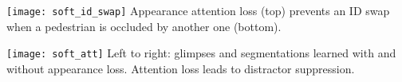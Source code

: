 
\vspace{.5\baselineskip}

\centering
\begin{minipage}[c]{.3\textwidth}
    \centering
    \texttt{[image: soft\_id\_swap]}
    \vspace{.5\baselineskip}
    Appearance attention loss (top) prevents an ID swap when a pedestrian is occluded by another one (bottom).
\end{minipage}
\begin{minipage}[c]{.3\textwidth}
    \centering
    \vspace{.5\baselineskip}
    \texttt{[image: soft\_att]}
    \vspace{.5\baselineskip}
   Left to right: glimpses and segmentations learned with and without appearance loss.
   Attention loss leads to distractor suppression. 
\end{minipage}